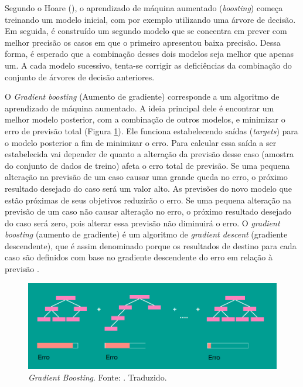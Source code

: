 Segundo o Hoare (\citeyear{Hoare:2019}), o aprendizado de máquina aumentado (\textit{boosting}) começa treinando um modelo inicial, com por exemplo utilizando uma árvore de decisão. Em seguida, é construído um segundo modelo que se concentra em prever com melhor precisão os casos em que o primeiro apresentou baixa precisão. Dessa forma, é esperado que a combinação desses dois modelos seja melhor que apenas um. A cada modelo sucessivo, tenta-se corrigir as deficiências da combinação do conjunto de árvores de decisão anteriores.

O \textit{Gradient boosting} (Aumento de gradiente) corresponde a um algoritmo de aprendizado de máquina aumentado. A ideia principal dele é encontrar um melhor modelo posterior, com a combinação de outros modelos, e minimizar o erro de previsão total (Figura \ref{fig:gradient_boosting}). Ele funciona estabelecendo saídas (\textit{targets}) para o modelo posterior a fim de minimizar o erro. Para calcular essa saída a ser estabelecida vai depender de quanto a alteração da previsão desse caso (amostra do conjunto de dados de treino) afeta o erro total de previsão. Se uma pequena alteração na previsão de um caso causar uma grande queda no erro, o próximo resultado desejado do caso será um valor alto. As previsões do novo modelo que estão próximas de seus objetivos reduzirão o erro. Se uma pequena alteração na previsão de um caso não causar alteração no erro, o próximo resultado desejado do caso será zero, pois alterar essa previsão não diminuirá o erro. O \textit{gradient boosting} (aumento de gradiente) é um algoritmo de \textit{gradient descent} (gradiente descendente), que é assim denominado porque os resultados de destino para cada caso são definidos com base no gradiente descendente do erro em relação à previsão \cite{Hoare:2019}.

\begin{figure}[H]
    \centering
    \includegraphics[scale=0.4]{figuras/referencial_teorico/gradient_boosting.png}
    \caption[Gradient Boosting]{\textit{Gradient Boosting}. Fonte: \cite{Chepenko:2019}. Traduzido.}
    \label{fig:gradient_boosting}
\end{figure}
 

